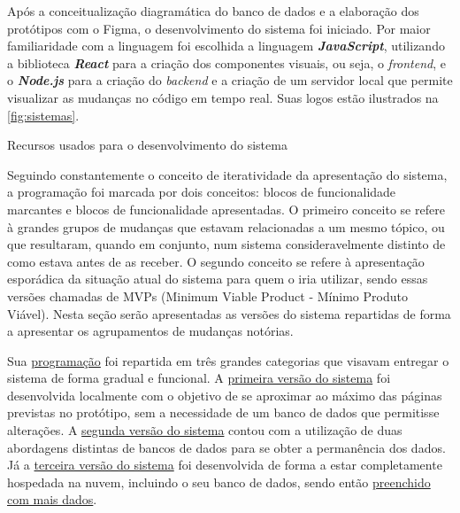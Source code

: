 Após a conceitualização diagramática do banco de dados e a elaboração dos protótipos com o Figma, o desenvolvimento do sistema foi iniciado. Por maior familiaridade com a linguagem foi escolhida a linguagem \textbf{\textit{JavaScript}}, utilizando a biblioteca \textbf{\textit{React}} para a criação dos componentes visuais, ou seja, o \textit{frontend}, e o \textbf{\textit{Node.js}} para a criação do \textit{backend} e a criação de um servidor local que permite visualizar as mudanças no código em tempo real. Suas logos estão ilustrados na \autoref{fig:sistemas}.

\begin{MyCenteredFigure} \caption{Recursos usados para o desenvolvimento do sistema} \label{fig:sistemas}
  \begin{animateinline}{1}
    \newframe
    \newframe
  \end{animateinline}
\end{MyCenteredFigure}

Seguindo constantemente o conceito de iteratividade da apresentação do sistema, a programação foi marcada por dois conceitos: blocos de funcionalidade marcantes e blocos de funcionalidade apresentadas. O primeiro conceito se refere à grandes grupos de mudanças que estavam relacionadas a um mesmo tópico, ou que resultaram, quando em conjunto, num sistema consideravelmente distinto de como estava antes de as receber. O segundo conceito se refere à apresentação esporádica da situação atual do sistema para quem o iria utilizar, sendo essas versões chamadas de MVPs (Minimum Viable Product - Mínimo Produto Viável). Nesta seção serão apresentadas as versões do sistema repartidas de forma a apresentar os agrupamentos de mudanças notórias.

Sua \hyperref[sec:programação]{programação} foi repartida em três grandes categorias que visavam entregar o sistema de forma gradual e funcional. A \hyperref[ssec:MVP1]{primeira versão do sistema} foi desenvolvida localmente com o objetivo de se aproximar ao máximo das páginas previstas no protótipo, sem a necessidade de um banco de dados que permitisse alterações. A \hyperref[ssec:MVP2]{segunda versão do sistema} contou com a utilização de duas abordagens distintas de bancos de dados para se obter a permanência dos dados. Já a \hyperref[ssec:MVP3]{terceira versão do sistema} foi desenvolvida de forma a estar completamente hospedada na nuvem, incluindo o seu banco de dados, sendo então \hyperref[sec:preenchimento]{preenchido com mais dados}.

